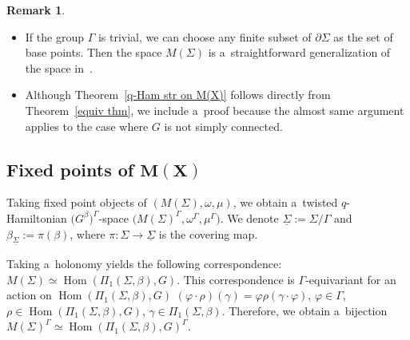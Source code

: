 \documentclass[pdftex]{sigma}
\numberwithin{equation}{section}
\theoremstyle{definition}
\newtheorem{Remark}[Theorem]{Remark}
\newcommand{\Hom}{\operatorname{Hom}}
\begin{document}
\begin{Remark}\quad
\begin{itemize}\itemsep=0pt
 \item[(1)] If the group $\Gamma$ is trivial, we can choose any finite subset of $\partial \Sigma$ as the set of base points.
 Then the space $M(\Sigma)$ is a~straightforward generalization of the space in~\cite[Theorem~9.1]{AMM}.
 \item[(2)] Although Theorem~\ref{q-Ham str on M(X)} follows directly from Theorem~\ref{equiv thm}, we include a~proof because the almost same argument applies to the case where $G$ is not simply connected.
 \end{itemize}
\end{Remark}

\subsection[Fixed points of M(X)]{Fixed points of $\boldsymbol{M(X)}$}\label{section_twisted_reps}
Taking fixed point objects of $(M(\Sigma),\omega,\mu)$, we obtain a~twisted $q$-Hamiltonian $\bigl(G^{\beta}\bigr)^{\Gamma}$-space $\bigl(M(\Sigma)^{\Gamma},\omega^{\Gamma},\mu^{\Gamma}\bigr)$.
We denote $ \underline{\Sigma} := \Sigma /\Gamma$ and $\beta_{\underline{\Sigma}} := \pi(\beta)$, where $\pi \colon \Sigma \to \underline{\Sigma}$ is the covering map.

Taking a~holonomy yields the following correspondence: $M(\Sigma) \simeq \Hom(\Pi_1(\Sigma,\beta),G)$.
This correspondence is $\Gamma$-equivariant for an action on $\Hom(\Pi_1(\Sigma,\beta),G)$
$(\varphi \cdot \rho)(\gamma) = \varphi \rho(\gamma\cdot\varphi)$, $
 \varphi \in \Gamma$, ${\rho \in \Hom(\Pi_1(\Sigma,\beta),G)}$, $ \gamma \in \Pi_1(\Sigma,\beta)$.
Therefore, we obtain a~bijection $M(\Sigma)^{\Gamma} \simeq \Hom(\Pi_1(\Sigma,\beta),G)^{\Gamma}$.
\end{document}
